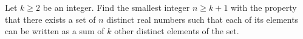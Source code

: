 Let $k \geq 2$ be an integer. Find the smallest integer $n \geq k+1$ with the property that there exists a set of $n$ distinct real numbers such that each of its elements can be written as a sum of $k$ other distinct elements of the set.
